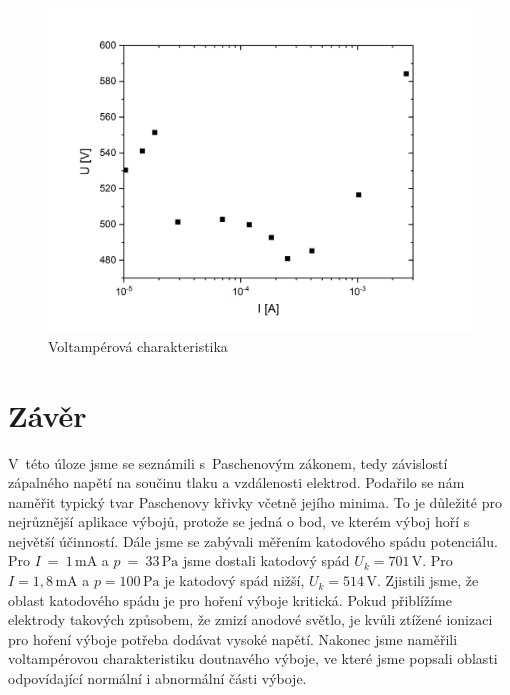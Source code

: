 \documentclass[a4paper,12pt]{article}
\begin{document}
\begin{figure}[h!]
	\centering
	\includegraphics[width=145mm]{VAodpor.png}
	\caption{Voltampérová charakteristika}
	\label{VAodpor}
\end{figure}

\clearpage
\section{Závěr}
V~této úloze jsme se seznámili s~Paschenovým zákonem, tedy závislostí zápalného napětí na součinu tlaku a vzdálenosti elektrod. Podařilo se nám naměřit typický tvar Paschenovy křivky včetně jejího minima. To je důležité pro nejrůznější aplikace výbojů, protože se jedná o bod, ve kterém výboj hoří s největší účinností.
Dále jsme se zabývali měřením katodového spádu potenciálu. Pro $I~=~1\,\si{\milli\ampere}$ a $p~=~33\,\si{\pascal}$ jsme dostali katodový spád $U_k = 701\,\si{\volt}$. Pro $I = 1,8\,\si{\milli\ampere}$ a $p = 100\,\si{\pascal}$ je katodový spád nižší,  $U_k = 514\,\si{\volt}$. Zjistili jsme, že oblast katodového spádu je pro hoření výboje kritická. Pokud přiblížíme elektrody takových způsobem, že zmizí anodové světlo, je kvůli ztížené ionizaci pro hoření výboje potřeba dodávat vysoké napětí. Nakonec jsme naměřili voltampérovou charakteristiku doutnavého výboje, ve které jsme popsali oblasti odpovídající normální i abnormální části výboje.
\end{document}
